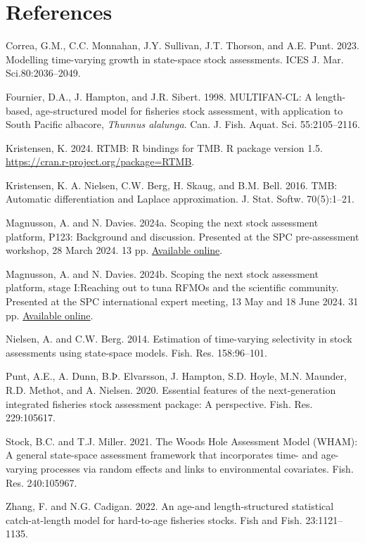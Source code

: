 \documentclass{SCreport}
\newcommand\github
{https://github.com/PacificCommunity/ofp-sam-transition-plan/blob/main}
\newcommand\present{\github/presentations}
\begin{document}
\section{References}

\sloppy\setlength{}

\begin{description}\setlength\itemsep{0ex}
  \item Correa, G.M., C.C. Monnahan, J.Y. Sullivan, J.T. Thorson, and A.E. Punt.
  2023. Modelling time-varying growth in state-space stock assessments. ICES J.
  Mar. Sci.80:2036--2049.
  \item Fournier, D.A., J. Hampton, and J.R. Sibert. 1998. MULTIFAN-CL: A
  length-based, age-structured model for fisheries stock assessment, with
  application to South Pacific albacore, \textit{Thunnus alalunga}. Can. J.
  Fish. Aquat. Sci. 55:2105--2116.
  \item Kristensen, K. 2024. RTMB: R bindings for TMB. R package version 1.5.\\
  \href{https://cran.r-project.org/package=RTMB}
  {https://cran.r-project.org/package=RTMB}.
  \item Kristensen, K. A. Nielsen, C.W. Berg, H. Skaug, and B.M. Bell. 2016.
  TMB: Automatic differentiation and Laplace approximation. J. Stat. Softw.
  70(5):1--21.
  \item Magnusson, A. and N. Davies. 2024a. Scoping the next stock assessment
  platform, P123: Background and discussion. Presented at the SPC pre-assessment
  workshop, 28 March 2024. 13 pp.
  \href{\present/2024_03_28_paw_scoping/2024_03_28_paw_scoping.pdf}
  {Available online}.
  \item Magnusson, A. and N. Davies. 2024b. Scoping the next stock assessment
  platform, stage I:\linebreak Reaching out to tuna RFMOs and the scientific
  community. Presented at the SPC international expert meeting, 13 May and 18
  June 2024. 31 pp.
  \href{\present/2024_05_13_experts_scoping/2024_05_13_experts_scoping.pdf}
  {Available online}.
  \item Nielsen, A. and C.W. Berg. 2014. Estimation of time-varying selectivity
  in stock assessments using state-space models. Fish. Res. 158:96--101.
  \item Punt, A.E., A. Dunn, B.Þ. Elvarsson, J. Hampton, S.D. Hoyle, M.N.
  Maunder, R.D. Methot, and A. Nielsen. 2020. Essential features of the
  next-generation integrated fisheries stock assessment package: A perspective.
  Fish. Res. 229:105617.
  \item Stock, B.C. and T.J. Miller. 2021. The Woods Hole Assessment Model
  (WHAM): A general state-space assessment framework that incorporates time- and
  age-varying processes via random effects and links to environmental
  covariates. Fish. Res. 240:105967.
  \item Zhang, F. and N.G. Cadigan. 2022. An age-and length-structured
  statistical catch-at-length model for hard-to-age fisheries stocks. Fish and
  Fish. 23:1121--1135.
\end{description}
\end{document}
